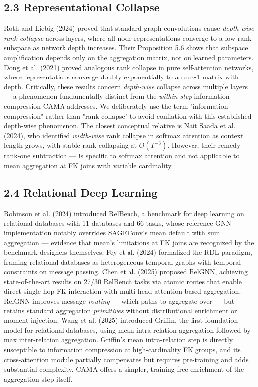 \documentclass[final]{article}
\begin{document}
\subsection{2.3 Representational Collapse}

Roth and Liebig (2024) proved that standard graph convolutions cause \textit{depth-wise rank collapse} across layers, where all node representations converge to a low-rank subspace as network depth increases. Their Proposition 5.6 shows that subspace amplification depends only on the aggregation matrix, not on learned parameters. Dong et al. (2021) proved analogous rank collapse in pure self-attention networks, where representations converge doubly exponentially to a rank-1 matrix with depth. Critically, these results concern \textit{depth-wise} collapse across multiple layers --- a phenomenon fundamentally distinct from the \textit{within-step} information compression CAMA addresses. We deliberately use the term "information compression" rather than "rank collapse" to avoid conflation with this established depth-wise phenomenon. The closest conceptual relative is Nait Saada et al. (2024), who identified \textit{width-wise} rank collapse in softmax attention as context length grows, with stable rank collapsing at $O(T^{-3})$. However, their remedy --- rank-one subtraction --- is specific to softmax attention and not applicable to mean aggregation at FK joins with variable cardinality.

\subsection{2.4 Relational Deep Learning}

Robinson et al. (2024) introduced RelBench, a benchmark for deep learning on relational databases with 11 databases and 66 tasks, whose reference GNN implementation notably overrides SAGEConv's mean default with sum aggregation --- evidence that mean's limitations at FK joins are recognized by the benchmark designers themselves. Fey et al. (2024) formalized the RDL paradigm, framing relational databases as heterogeneous temporal graphs with temporal constraints on message passing. Chen et al. (2025) proposed RelGNN, achieving state-of-the-art results on 27/30 RelBench tasks via atomic routes that enable direct single-hop FK interaction with multi-head attention-based aggregation. RelGNN improves message \textit{routing} --- which paths to aggregate over --- but retains standard aggregation \textit{primitives} without distributional enrichment or moment injection. Wang et al. (2025) introduced Griffin, the first foundation model for relational databases, using mean intra-relation aggregation followed by max inter-relation aggregation. Griffin's mean intra-relation step is directly susceptible to information compression at high-cardinality FK groups, and its cross-attention module partially compensates but requires pre-training and adds substantial complexity. CAMA offers a simpler, training-free enrichment of the aggregation step itself.
\end{document}
